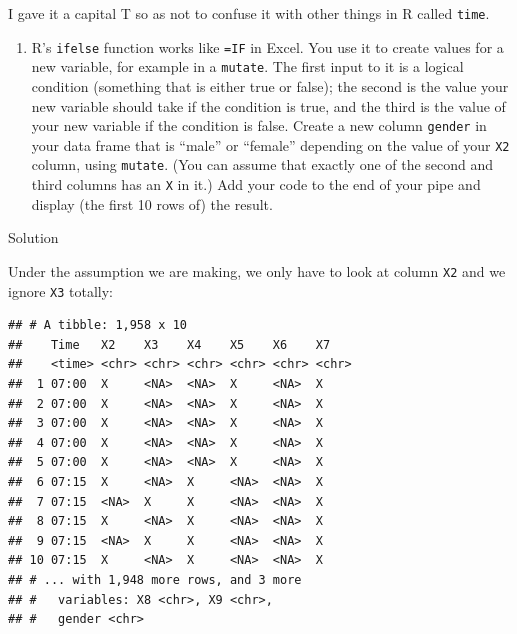 \documentclass[]{tufte-book}
\newenvironment{Shaded}{}{}
\newcommand{\DataTypeTok}[1]{\textcolor[rgb]{0.56,0.13,0.00}{#1}}
\newcommand{\KeywordTok}[1]{\textcolor[rgb]{0.00,0.44,0.13}{\textbf{#1}}}
\newcommand{\NormalTok}[1]{#1}
\newcommand{\OperatorTok}[1]{\textcolor[rgb]{0.40,0.40,0.40}{#1}}
\newcommand{\StringTok}[1]{\textcolor[rgb]{0.25,0.44,0.63}{#1}}
\providecommand{\tightlist}{%
  \setlength{\itemsep}{0pt}\setlength{\parskip}{0pt}}
\theoremstyle{definition}
\theoremstyle{definition}
\theoremstyle{definition}
\theoremstyle{remark}
\begin{document}
I gave it a capital T so as not to confuse it with other things in R
called \texttt{time}.

\begin{enumerate}
\def\labelenumi{(\alph{enumi})}
\setcounter{enumi}{4}
\tightlist
\item
  R's \texttt{ifelse} function works like \texttt{=IF} in Excel. You use
  it to create values for a new variable, for example in a
  \texttt{mutate}. The first input to it is a logical condition
  (something that is either true or false); the second is the value your
  new variable should take if the condition is true, and the third is
  the value of your new variable if the condition is false. Create a new
  column \texttt{gender} in your data frame that is ``male'' or
  ``female'' depending on the value of your \texttt{X2} column, using
  \texttt{mutate}. (You can assume that exactly one of the second and
  third columns has an \texttt{X} in it.) Add your code to the end of
  your pipe and display (the first 10 rows of) the result.
\end{enumerate}

Solution

Under the assumption we are making, we only have to look at column
\texttt{X2} and we ignore \texttt{X3} totally:

\begin{Shaded}
\end{Shaded}

\begin{verbatim}
## # A tibble: 1,958 x 10
##    Time   X2    X3    X4    X5    X6    X7   
##    <time> <chr> <chr> <chr> <chr> <chr> <chr>
##  1 07:00  X     <NA>  <NA>  X     <NA>  X    
##  2 07:00  X     <NA>  <NA>  X     <NA>  X    
##  3 07:00  X     <NA>  <NA>  X     <NA>  X    
##  4 07:00  X     <NA>  <NA>  X     <NA>  X    
##  5 07:00  X     <NA>  <NA>  X     <NA>  X    
##  6 07:15  X     <NA>  X     <NA>  <NA>  X    
##  7 07:15  <NA>  X     X     <NA>  <NA>  X    
##  8 07:15  X     <NA>  X     <NA>  <NA>  X    
##  9 07:15  <NA>  X     X     <NA>  <NA>  X    
## 10 07:15  X     <NA>  X     <NA>  <NA>  X    
## # ... with 1,948 more rows, and 3 more
## #   variables: X8 <chr>, X9 <chr>,
## #   gender <chr>
\end{verbatim}
\end{document}
